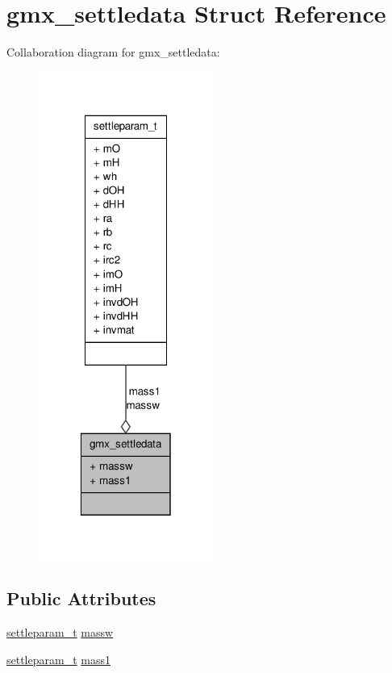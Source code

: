 \hypertarget{structgmx__settledata}{\section{gmx\-\_\-settledata \-Struct \-Reference}
\label{structgmx__settledata}
}


\-Collaboration diagram for gmx\-\_\-settledata\-:
\nopagebreak
\begin{figure}[H]
\begin{center}
\leavevmode
\includegraphics[width=162pt]{structgmx__settledata__coll__graph}
\end{center}
\end{figure}
\subsection*{\-Public \-Attributes}
\begin{DoxyCompactItemize}
\item 
\hyperlink{structsettleparam__t}{settleparam\-\_\-t} \hyperlink{structgmx__settledata_ac95ea696e2f19c98bf4da7a3d3421650}{massw}
\item 
\hyperlink{structsettleparam__t}{settleparam\-\_\-t} \hyperlink{structgmx__settledata_a4df40e6d1ce20463399e1701c48a7167}{mass1}
\end{DoxyCompactItemize}


